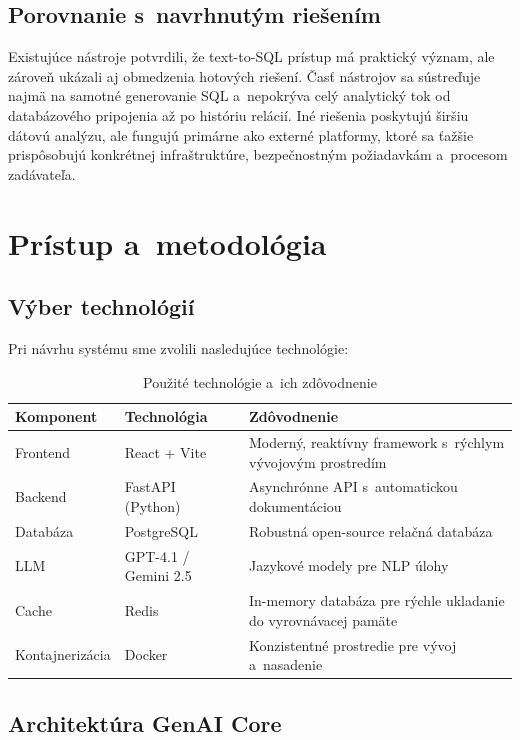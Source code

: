 \documentclass[a4paper, 12pt]{article}
\begin{document}
\subsection{Porovnanie s~navrhnutým riešením}

Existujúce nástroje potvrdili, že text-to-SQL prístup má praktický význam, ale zároveň ukázali aj obmedzenia hotových riešení. Časť nástrojov sa sústreďuje najmä na samotné generovanie SQL a~nepokrýva celý analytický tok od databázového pripojenia až po históriu relácií. Iné riešenia poskytujú širšiu dátovú analýzu, ale fungujú primárne ako externé platformy, ktoré sa ťažšie prispôsobujú konkrétnej infraštruktúre, bezpečnostným požiadavkám a~procesom zadávateľa.


\clearpage

\section{Prístup a~metodológia}

\subsection{Výber technológií}

Pri návrhu systému sme zvolili nasledujúce technológie:

\begin{table}[H]
\centering
\begin{tabular}{llp{7cm}}
\toprule
\textbf{Komponent} & \textbf{Technológia} & \textbf{Zdôvodnenie} \\
\midrule
Frontend & React + Vite & Moderný, reaktívny framework s~rýchlym vývojovým prostredím \\
Backend & FastAPI (Python) & Asynchrónne API s~automatickou dokumentáciou \\
Databáza & PostgreSQL & Robustná open-source relačná databáza \\
LLM & GPT-4.1 / Gemini 2.5 & Jazykové modely pre NLP úlohy \\
Cache & Redis & In-memory databáza pre rýchle ukladanie do vyrovnávacej pamäte \\
Kontajnerizácia & Docker & Konzistentné prostredie pre vývoj a~nasadenie \\
\bottomrule
\end{tabular}
\caption{Použité technológie a~ich zdôvodnenie}
\end{table}

\subsection{Architektúra GenAI Core}
\end{document}
